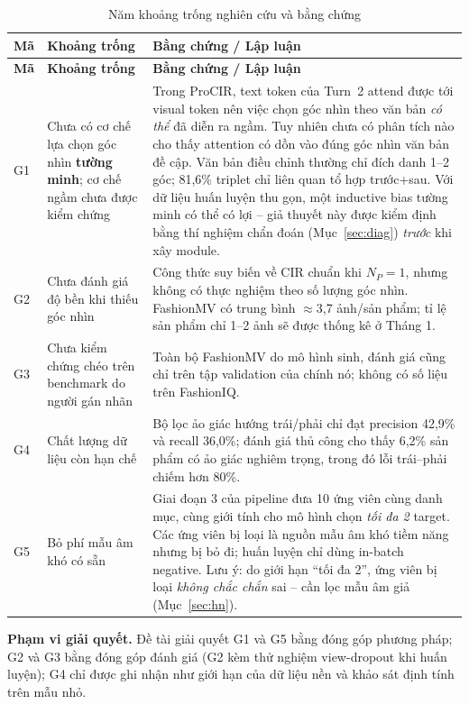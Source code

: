 \documentclass[a4paper]{article}
\begin{document}
\begin{longtable}{L{0.8cm}L{4.2cm}L{10.2cm}}
\caption{Năm khoảng trống nghiên cứu và bằng chứng}\label{tab:gap}\\
\toprule
\textbf{Mã} & \textbf{Khoảng trống} & \textbf{Bằng chứng / Lập luận}\\
\midrule\endfirsthead
\toprule
\textbf{Mã} & \textbf{Khoảng trống} & \textbf{Bằng chứng / Lập luận}\\
\midrule\endhead
G1 & Chưa có cơ chế lựa chọn góc nhìn \textbf{tường minh}; cơ chế ngầm chưa được kiểm chứng & Trong ProCIR, text token của Turn~2 attend được tới visual token nên việc chọn góc nhìn theo văn bản \textit{có thể} đã diễn ra ngầm. Tuy nhiên chưa có phân tích nào cho thấy attention có dồn vào đúng góc nhìn văn bản đề cập. Văn bản điều chỉnh thường chỉ đích danh 1--2 góc; 81,6\% triplet chỉ liên quan tổ hợp trước+sau. Với dữ liệu huấn luyện thu gọn, một inductive bias tường minh có thể có lợi -- giả thuyết này được kiểm định bằng thí nghiệm chẩn đoán (Mục~\ref{sec:diag}) \textit{trước} khi xây module.\\
G2 & Chưa đánh giá độ bền khi thiếu góc nhìn & Công thức suy biến về CIR chuẩn khi $N_P=1$, nhưng không có thực nghiệm theo số lượng góc nhìn. FashionMV có trung bình $\approx$3,7 ảnh/sản phẩm; tỉ lệ sản phẩm chỉ 1--2 ảnh sẽ được thống kê ở Tháng 1.\\
G3 & Chưa kiểm chứng chéo trên benchmark do người gán nhãn & Toàn bộ FashionMV do mô hình sinh, đánh giá cũng chỉ trên tập validation của chính nó; không có số liệu trên FashionIQ.\\
G4 & Chất lượng dữ liệu còn hạn chế & Bộ lọc ảo giác hướng trái/phải chỉ đạt precision 42,9\% và recall 36,0\%; đánh giá thủ công cho thấy 6,2\% sản phẩm có ảo giác nghiêm trọng, trong đó lỗi trái--phải chiếm hơn 80\%.\\
G5 & Bỏ phí mẫu âm khó có sẵn & Giai đoạn 3 của pipeline đưa 10 ứng viên cùng danh mục, cùng giới tính cho mô hình chọn \textit{tối đa 2} target. Các ứng viên bị loại là nguồn mẫu âm khó tiềm năng nhưng bị bỏ đi; huấn luyện chỉ dùng in-batch negative. Lưu ý: do giới hạn ``tối đa 2'', ứng viên bị loại \textit{không chắc chắn} sai -- cần lọc mẫu âm giả (Mục~\ref{sec:hn}).\\
\bottomrule
\end{longtable}

\textbf{Phạm vi giải quyết.} Đề tài giải quyết G1 và G5 bằng đóng góp phương pháp; G2 và G3 bằng đóng góp đánh giá (G2 kèm thử nghiệm view-dropout khi huấn luyện); G4 chỉ được ghi nhận như giới hạn của dữ liệu nền và khảo sát định tính trên mẫu nhỏ.
\end{document}
